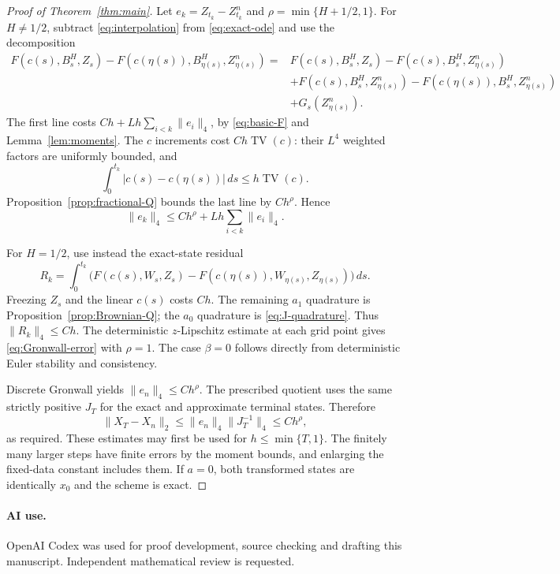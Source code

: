 \documentclass[11pt]{article}
\theoremstyle{remark}
\newcommand{\norm}[1]{\lVert#1\rVert}
\newcommand{\abs}[1]{\lvert#1\rvert}
\DeclareMathOperator{\TV}{TV}
\begin{document}
\begin{proof}[Proof of Theorem~\ref{thm:main}]
Let \(e_k=Z_{t_k}-Z^n_{t_k}\) and
\(\rho=\min\{H+1/2,1\}\).
For \(H\ne1/2\), subtract \eqref{eq:interpolation} from
\eqref{eq:exact-ode} and use the decomposition
\[
 \begin{split}
 F(c(s),B^H_s,Z_s)-F(c(\eta(s)),B^H_{\eta(s)},Z^n_{\eta(s)})
  ={}&F(c(s),B^H_s,Z_s)-F(c(s),B^H_s,Z^n_{\eta(s)})\\
   &+F(c(s),B^H_s,Z^n_{\eta(s)})
                 -F(c(\eta(s)),B^H_s,Z^n_{\eta(s)})\\
   &+G_s(Z^n_{\eta(s)}).
 \end{split}
\]
The first line costs \(Ch+Lh\sum_{i<k}\norm{e_i}_4\), by
\eqref{eq:basic-F} and Lemma~\ref{lem:moments}.
The \(c\) increments cost \(Ch\TV(c)\): their \(L^4\) weighted
factors are uniformly bounded, and
\[
 \int_0^{t_k}\abs{c(s)-c(\eta(s))}\,ds\le h\TV(c).
\]
Proposition~\ref{prop:fractional-Q} bounds the last line by \(Ch^\rho\).
Hence
\begin{equation}\label{eq:Gronwall-error}
 \norm{e_k}_4\le Ch^\rho+Lh\sum_{i<k}\norm{e_i}_4 .
\end{equation}

For \(H=1/2\), use instead the exact-state residual
\[
 R_k=\int_0^{t_k}
  \bigl(F(c(s),W_s,Z_s)-F(c(\eta(s)),W_{\eta(s)},Z_{\eta(s)})\bigr)\,ds.
\]
Freezing \(Z_s\) and the linear \(c(s)\) costs \(Ch\).
The remaining \(a_1\) quadrature is
Proposition~\ref{prop:Brownian-Q}; the \(a_0\) quadrature is
\eqref{eq:J-quadrature}. Thus \(\norm{R_k}_4\le Ch\).
The deterministic \(z\)-Lipschitz estimate at each grid point gives
\eqref{eq:Gronwall-error} with \(\rho=1\).
The case \(\beta=0\) follows directly from deterministic Euler
stability and consistency.

Discrete Gronwall yields \(\norm{e_n}_4\le Ch^\rho\).
The prescribed quotient uses the same strictly positive \(J_T\)
for the exact and approximate terminal states. Therefore
\[
 \norm{X_T-X_n}_2\le\norm{e_n}_4\norm{J_T^{-1}}_4\le Ch^\rho,
\]
as required. These estimates may first be used for \(h\le\min\{T,1\}\).
The finitely many larger steps have finite errors by the moment bounds,
and enlarging the fixed-data constant includes them.
If \(a=0\), both transformed states are identically \(x_0\) and
the scheme is exact.
\end{proof}

\paragraph{AI use.}
OpenAI Codex was used for proof development, source checking and drafting
this manuscript. Independent mathematical review is requested.
\end{document}
